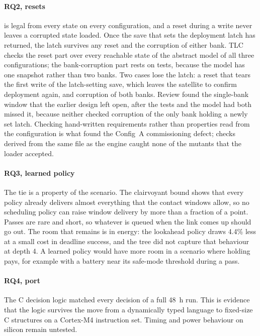 \documentclass[preprint,12pt]{elsarticle}
\newcommand{\cfgA}{Config~A}
\begin{document}
\paragraph{RQ2, resets}  is legal from every state on every configuration, and a reset during a write never leaves a corrupted state loaded. Once the save that sets the deployment latch has returned, the latch survives any reset and the corruption of either bank. TLC checks the reset part over every reachable state of the abstract model of all three configurations; the bank-corruption part rests on tests, because the model has one snapshot rather than two banks. Two cases lose the latch: a reset that tears the first write of the latch-setting save, which leaves the satellite to confirm deployment again, and corruption of both banks. Review found the single-bank window that the earlier design left open, after the tests and the model had both missed it, because neither checked corruption of the only bank holding a newly set latch. Checking hand-written requirements rather than properties read from the configuration is what found the \cfgA{} commissioning defect; checks derived from the same file as the engine caught none of the mutants that the loader accepted.

\paragraph{RQ3, learned policy} The tie is a property of the scenario. The clairvoyant bound shows that every policy already delivers almost everything that the contact windows allow, so no scheduling policy can raise window delivery by more than a fraction of a point. Passes are rare and short, so whatever is queued when the link comes up should go out. The room that remains is in energy: the lookahead policy draws 4.4\% less at a small cost in deadline success, and the tree did not capture that behaviour at depth 4. A learned policy would have more room in a scenario where holding pays, for example with a battery near its safe-mode threshold during a pass.

\paragraph{RQ4, port} The C decision logic matched every decision of a full 48~h run. This is evidence that the logic survives the move from a dynamically typed language to fixed-size C structures on a Cortex-M4 instruction set. Timing and power behaviour on silicon remain untested.
\end{document}
